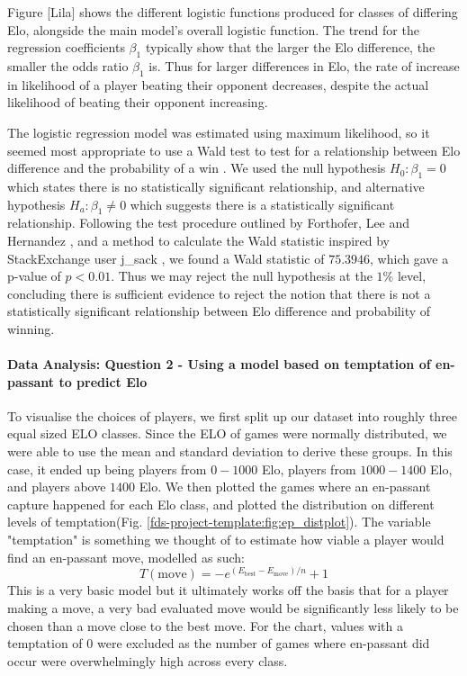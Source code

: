 \documentclass[10pt,a4paper]{article}
\begin{document}
\begin{multicols}{2}
Figure [Lila] shows the different logistic functions produced for classes of differing Elo, alongside the main model's overall logistic function. The trend for the regression coefficients $\beta_{1}$ typically show that the larger the Elo difference, the smaller the odds ratio $\beta_{1}$ is. Thus for larger differences in Elo, the rate of increase in likelihood of a player beating their opponent decreases, despite the actual likelihood of beating their opponent increasing. \newline

The logistic regression model was estimated using maximum likelihood, so it seemed most appropriate to use a Wald test to test for a relationship between Elo difference and the probability of a win \cite{WaldTest}. We used the null hypothesis $H_{0}: \beta_{1} = 0$ which states there is no statistically significant relationship, and alternative hypothesis $H_{a}: \beta_{1} \neq 0$ which suggests there is a statistically significant relationship. Following the test procedure outlined by Forthofer, Lee and Hernandez \cite{WaldTest}, and a method to calculate the Wald statistic inspired by StackExchange user j\_sack \cite{StackExchangeWaldTest}, we found a Wald statistic of $75.3946$, which gave a p-value of $p<0.01$. Thus we may reject the null hypothesis at the $1\%$ level, concluding there is sufficient evidence to reject the notion that there is not a statistically significant relationship between Elo difference and probability of winning. \newline



\paragraph{Data Analysis: Question 2 - Using a model based on temptation of en-passant to predict Elo}
To visualise the choices of players, we first split up our dataset into roughly three equal sized ELO classes. Since the ELO of games were normally distributed, we were able to use the mean and standard deviation to derive these groups. In this case, it ended up being players from $0 - 1000$ Elo, players from $1000 - 1400$ Elo, and players above $1400$ Elo. We then plotted the games where an en-passant capture happened for each Elo class, and plotted the distribution on different levels of temptation(Fig. \ref{fds-project-template:fig:ep_distplot}). The variable "temptation" is something we thought of to estimate how viable a player would find an en-passant move, modelled as such:
$$T(\text{move})= -e^{(E_{\text{best}} - E_{\text{move}})/{n}} + 1$$
This is a very basic model but it ultimately works off the basis that for a player making a move, a very bad evaluated move would be significantly less likely to be chosen than a move close to the best move. For the chart, values with a temptation of $0$ were excluded as the number of games where en-passant did occur were overwhelmingly high across every class.\newline


\end{multicols}
\end{document}
